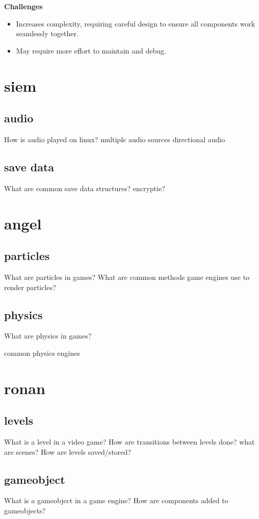 \documentclass{article} %
\begin{document}
\textbf{Challenges}
\begin{itemize}
    \item Increases complexity, requiring careful design to ensure all components work seamlessly together.
    \item May require more effort to maintain and debug.
\end{itemize}

\newpage

\section{siem}
\subsection{audio}
How is audio played on linux?
multiple audio sources
directional audio
\subsection{save data}
What are common save data structures?
encryptie?
\newpage

\section{angel}
\subsection{particles}
What are particles in games?
What are common methods game engines use to render particles?
\subsection{physics}
What are physics in games?

common physics engines

\newpage

\section{ronan}
\subsection{levels}
What is a level in a video game?
How are transitions between levels done?
what are scenes?
How are levels saved/stored?
\subsection{gameobject}
What is a gameobject in a game engine?
How are components added to gameobjects?
\end{document}
